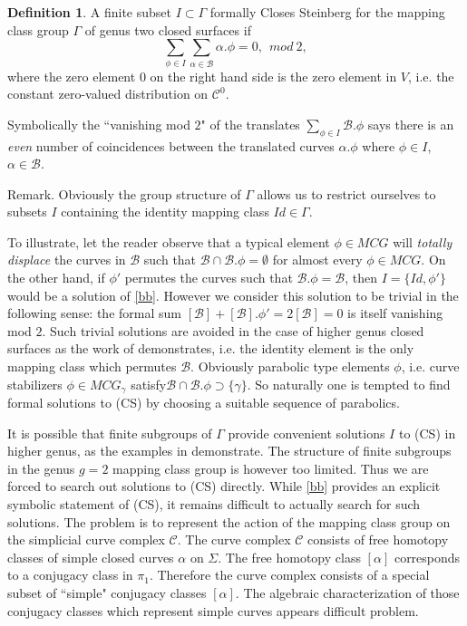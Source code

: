 \documentclass[12pt]{amsart}
\theoremstyle{definition}
\newtheorem{dfn}[thm]{Definition}
\theoremstyle{remark}
\newcommand{\sB}{\mathscr{B}}
\newcommand{\sC}{\mathscr{C}}
\begin{document}
\begin{dfn}
A finite subset $I\subset \Gamma$ formally Closes Steinberg for the mapping class group $\Gamma$ of genus two closed surfaces if 
\begin{equation}
\label{bb}
\sum_{\phi\in I} \sum_{\alpha\in \sB}\alpha.\phi=0, ~~mod~2,
\end{equation}
where the zero element $0$ on the right hand side is the zero element in $V$, i.e. the constant zero-valued distribution on $\sC^0$. 
\end{dfn}

Symbolically the ``vanishing mod $2$" of the translates $\sum_{\phi\in I} \sB.\phi$ says there is an \emph{even} number of coincidences between the translated curves $\alpha.\phi$ where $\phi\in I$, $\alpha\in \sB$. 

Remark. Obviously the group structure of $\Gamma$ allows us to restrict ourselves to subsets $I$ containing the identity mapping class $Id\in \Gamma$. 

To illustrate, let the reader observe that a typical element $\phi\in MCG$ will \emph{totally displace} the curves in $\sB$ such that $\sB \cap \sB.\phi=\emptyset$ for almost every $\phi\in MCG$. On the other hand, if $\phi'$ permutes the curves such that $\sB.\phi=\sB$, then $I=\{Id,\phi'\}$ would be a solution of \eqref{bb}. However we consider this solution to be trivial in the following sense: the formal sum $[\sB]+[\sB].\phi'=2[\sB]=0$ is itself vanishing mod $2$. Such trivial solutions are avoided in the case of higher genus closed surfaces as the work of \cite{birman2013finite} demonstrates, i.e. the identity element is the only mapping class which permutes $\sB$. Obviously parabolic type elements $\phi$, i.e. curve stabilizers $\phi\in MCG_\gamma$ satisfy$\sB \cap \sB.\phi \supset \{\gamma\}$. So naturally one is tempted to find formal solutions to (CS) by choosing a suitable sequence of parabolics. 

It is possible that finite subgroups of $\Gamma$ provide convenient solutions $I$ to (CS) in higher genus, as the examples in \cite{Cremona} demonstrate. The structure of finite subgroups in the genus $g=2$ mapping class group is however too limited. Thus we are forced to search out solutions to (CS) directly. While \eqref{bb} provides an explicit symbolic statement of (CS), it remains difficult to actually search for such solutions. The problem is to represent the action of the mapping class group on the simplicial curve complex $\sC$. The curve complex $\sC$ consists of free homotopy classes of simple closed curves $\alpha$ on $\Sigma$. The free homotopy class $[\alpha]$ corresponds to a conjugacy class in $\pi_1$. Therefore the curve complex consists of a special subset of ``simple" conjugacy classes $[\alpha]$. The algebraic characterization of those conjugacy classes which represent simple curves appears difficult problem.
\end{document}
